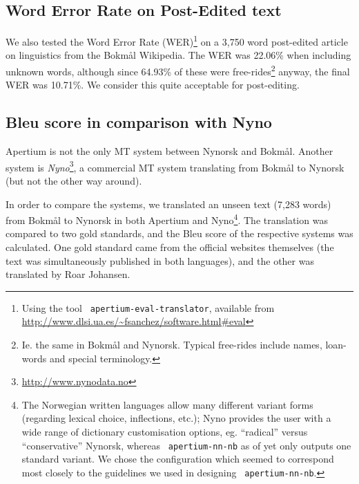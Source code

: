 \documentclass[11pt]{article}
\newcommand{\comment}[1]{\textbf{SKRIV} {\it #1}}
\renewcommand{\comment}[1]{}
\begin{document}
\subsection{Word Error Rate on Post-Edited text}
\label{sec:WER}
We also tested the Word Error Rate (WER)\footnote{Using the tool {\tt
    apertium-eval-translator}, available from
  \href{http://www.dlsi.ua.es/~fsanchez/software.html\#eval}{http://www.dlsi.ua.es/\~{}fsanchez/software.html\#eval}}
on a 3,750 word post-edited article on linguistics from the Bokmål
Wikipedia. The WER was 22.06\% when including unknown words, although
since 64.93\% of these were free-rides\footnote{Ie. the same
  in Bokmål and Nynorsk. Typical free-rides include names, loan-words
  and special terminology.} anyway, the final WER was 10.71\%. We
consider this quite acceptable for post-editing.

\comment{ {\tt apertium-nn-nb} may thus be used for dissemination (is
there a citation somewhere s.t. we may say ``$<15\%$ means we spend less
time post-editing than translating from scratch''?)}

\comment{ we should update this WER on the bleu-text, 10.71\%
does seem too good to be true / generalisable}

\subsection{{\sc Bleu} score in comparison with Nyno}

Apertium is not the only MT system between Nynorsk and Bokmål. Another
system is
\textit{Nyno}\footnote{\href{http://www.nynodata.no}{http://www.nynodata.no}},
a commercial MT system translating from Bokmål to Nynorsk (but not the
other way around). 

In order to compare the systems, we translated an unseen text (7,283
words) from Bokmål to Nynorsk in both Apertium and Nyno\footnote{The
  Norwegian written languages allow many different variant forms
  (regarding lexical choice, inflections, etc.); Nyno provides the
  user with a wide range of dictionary customisation options,
  eg. ``radical'' versus ``conservative'' Nynorsk, whereas {\tt
    apertium-nn-nb} as of yet only outputs one standard variant. We
  chose the \comment{standard/XYZ-}configuration which seemed to
  correspond most closely to the guidelines we used in designing {\tt
    apertium-nn-nb}.}. The translation was compared to two gold
standards, and the {\sc Bleu} score \citep{papineni2001bleu} of the
respective systems was calculated. One gold standard came from the
official websites themselves (the text was simultaneously published in
both languages), and the other was translated by Roar Johansen.
\end{document}
